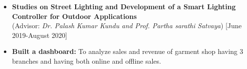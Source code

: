 \documentclass[11pt,a4paper]{moderncv}
\begin{document}
\begin{itemize}	
	
	\item\textbf{Studies on Street Lighting and
		Development of a Smart Lighting
		Controller for Outdoor
		Applications}\\
	 (Advisor: \textit{Dr. Palash Kumar Kundu and Prof. Partha
		sarathi Satvaya}) \hfill [June 2019-August 2020]%
	\item\textbf{Built a dashboard:} To analyze sales and revenue of garment shop having 3 branches and having both online and offline sales.
	
	
		
   
	
\end{itemize}
	
\end{document}
